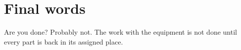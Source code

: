 \section{Final words}%
\label{sec:final_words}
Are you done? Probably not. The work with the equipment is not done until every part is back in its assigned place.

